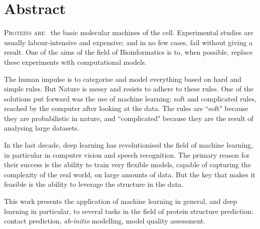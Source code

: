 \chapter{Abstract}
\lettrine[lines=3, lhang=0.25, nindent=0em, findent=2pt]{\color{Maroon}P}{roteins are\ }
the basic molecular machines of the cell.
Experimental studies are usually labour-intensive and expensive; and in no few cases, fail without giving a result.
One of the aims of the field of Bioinformatics is to, when possible, replace these experiments with computational models.

The human impulse is to categorise and model everything based on hard and simple rules.
But Nature is messy and resists to adhere to these rules.
One of the solutions put forward was the use of machine learning: soft and complicated rules, reached by the computer after looking at the data.
The rules are ``soft" because they are probabilistic in nature, and ``complicated" because they are the result of analysing large datasets.

In the last decade, deep learning has revolutionised the field of machine learning, in particular in computer vision and speech recognition.
The primary reason for their success is the ability to train very flexible models, capable of capturing the complexity of the real world, on large amounts of data.
But the key that makes it feasible is the ability to leverage the structure in the data. 

This work presents the application of machine learning in general, and deep learning in particular, to several tasks in the field of protein structure prediction: contact prediction, \emph{ab-initio} modelling, model quality assessment.


